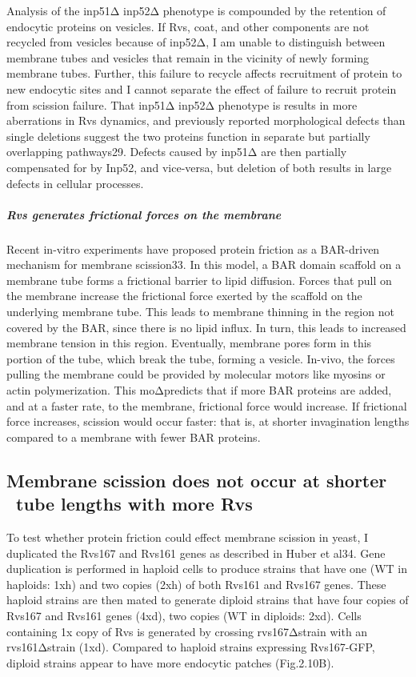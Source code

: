 	\vspace{5mm}
Analysis of the inp51Δ inp52Δ phenotype is compounded by the retention of endocytic proteins on vesicles. If Rvs, coat, and other components are not recycled from vesicles because of inp52Δ, I am unable to distinguish between membrane tubes and vesicles that remain in the vicinity of newly forming membrane tubes. Further, this failure to recycle affects recruitment of protein to new endocytic sites and I cannot separate the effect of failure to recruit protein from scission failure. That inp51Δ inp52Δ phenotype is results in more aberrations in Rvs dynamics, and previously reported morphological defects than single deletions suggest the two proteins function in separate but partially overlapping pathways29. Defects caused by inp51Δ are then partially compensated for by Inp52, and vice-versa, but deletion of both results in large defects in cellular processes.


				



\newpage

	\subparagraph{Rvs generates frictional forces on the membrane}
	Recent in-vitro experiments have proposed protein friction as a BAR-driven mechanism for membrane scission33. In this model, a BAR domain scaffold on a membrane tube forms a frictional barrier to lipid diffusion. Forces that pull on the membrane increase the frictional force exerted by the scaffold on the underlying membrane tube. This leads to membrane thinning in the region not covered by the BAR, since there is no lipid influx. In turn, this leads to increased membrane tension in this region. Eventually, membrane pores form in this portion of the tube, which break the tube, forming a vesicle. In-vivo, the forces pulling the membrane could be provided by molecular motors like myosins or actin polymerization.
This moΔpredicts that if more BAR proteins are added, and at a faster rate, to the membrane, frictional force would increase. If frictional force increases, scission would occur faster: that is, at shorter invagination lengths compared to a membrane with fewer BAR proteins. 


	\subsection{Membrane scission does not occur at shorter \
		tube lengths with more Rvs}
	
To test whether protein friction could effect membrane scission in yeast, I duplicated the Rvs167 and Rvs161 genes as described in Huber et al34. Gene duplication is performed in haploid cells to produce strains that have one (WT in haploids: 1xh) and two copies (2xh) of both Rvs161 and Rvs167 genes. These haploid strains are then mated to generate diploid strains that have four copies of Rvs167 and Rvs161 genes (4xd), two copies (WT in diploids: 2xd). Cells containing 1x copy of Rvs is generated by crossing rvs167Δstrain with an rvs161Δstrain (1xd). Compared to haploid strains expressing Rvs167-GFP, diploid strains appear to have more endocytic patches (Fig.2.10B). 


